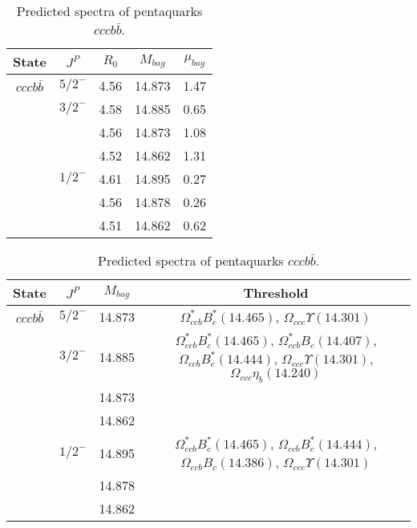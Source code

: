 \documentclass[prd,twocolumn,floatfix,nofootinbib]{revtex4}
\begin{document}
\renewcommand{\tabcolsep}{0.5cm}
\renewcommand{\arraystretch}{1.2}
\begin{table*}[!htbp]
    \caption{Predicted spectra of pentaquarks $cccb\bar{b}$.}
    \begin{tabular}{ccccc}
        \hline\hline
        {\rm State} &$J^{P}$ &$R_{0}$ &$M_{bag}$ &$\mu_{bag}$ \\ \hline
        ${cccb\bar{b}}$
        &${5/2}^{-}$    &4.56   &14.873 &1.47 \\
        &${3/2}^{-}$    &4.58   &14.885 &0.65 \\
        &               &4.56   &14.873 &1.08 \\
        &               &4.52   &14.862 &1.31 \\
        &${1/2}^{-}$    &4.61   &14.895 &0.27 \\
        &               &4.56   &14.878 &0.26 \\
        &               &4.51   &14.862 &0.62 \\
        \hline\hline
    \end{tabular}
\end{table*}

\renewcommand{\tabcolsep}{0.5cm}
\renewcommand{\arraystretch}{1.2}
\begin{table*}[!htbp]
    \caption{Predicted spectra of pentaquarks $cccb\bar{b}$.}
    \begin{tabular}{cccc}
        \hline\hline
        {\rm State} &$J^{P}$ &$M_{bag}$ &Threshold \\ \hline
        ${cccb\bar{b}}$
        &${5/2}^{-}$    &14.873 &$\Omega^{\ast}_{ccb} B^{\ast}_{c}(14.465)$, $\Omega_{ccc} \Upsilon(14.301)$ \\
        &${3/2}^{-}$    &14.885 &$\Omega^{\ast}_{ccb} B^{\ast}_{c}(14.465)$, $\Omega^{\ast}_{ccb} B_{c}(14.407)$, $\Omega_{ccb} B^{\ast}_{c}(14.444)$, $\Omega_{ccc} \Upsilon(14.301)$, $\Omega_{ccc} \eta_{b}(14.240)$ \\
        &               &14.873 & \\
        &               &14.862 & \\
        &${1/2}^{-}$    &14.895 &$\Omega^{\ast}_{ccb} B^{\ast}_{c}(14.465)$, $\Omega_{ccb} B^{\ast}_{c}(14.444)$, $\Omega_{ccb} B_{c}(14.386)$, $\Omega_{ccc} \Upsilon(14.301)$ \\
        &               &14.878 & \\
        &               &14.862 & \\
        \hline\hline
    \end{tabular}
\end{table*}
\end{document}
